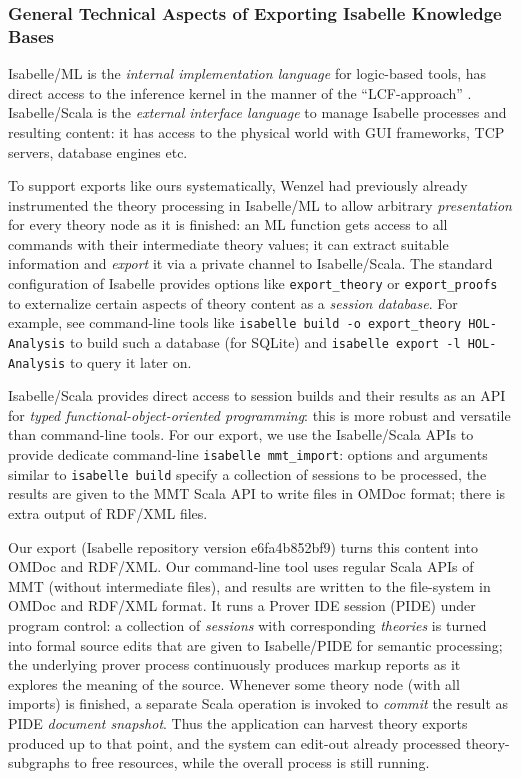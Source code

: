 \subsubsection{General Technical Aspects of Exporting Isabelle Knowledge Bases}

Isabelle/ML is the \emph{internal implementation language} for logic-based tools, has direct access to the inference kernel in the manner of the ``LCF-approach'' \cite{Gordon-Milner-Wadsworth:1979}.
Isabelle/Scala is the \emph{external interface language} to manage Isabelle processes and
resulting content: it has access to the physical world with GUI frameworks, TCP servers, database engines etc.

To support exports like ours systematically, Wenzel had previously already instrumented the theory processing in Isabelle/ML to allow arbitrary \emph{presentation} for every theory node as it is finished: an ML function gets access to all commands with their intermediate theory
values; it can extract suitable information and \emph{export} it via a private channel to Isabelle/Scala.
The standard configuration of Isabelle provides options like \verb,export_theory, or \verb,export_proofs, to externalize certain aspects of theory content as a \emph{session database}.
For example, see command-line tools like \verb,isabelle build -o export_theory HOL-Analysis, to build such a database (for SQLite) and \verb,isabelle export -l HOL-Analysis, to query it later on.

Isabelle/Scala provides direct access to session builds and their results as an API for \emph{typed functional-object-oriented programming}: this is more robust and versatile than command-line tools.
For our export, we use the Isabelle/Scala APIs to provide dedicate command-line \verb,isabelle mmt_import,: options and arguments similar to \verb,isabelle build, specify a collection of sessions to be processed, the results are given to the MMT Scala API to write files in OMDoc format; there is extra output of RDF/XML files.

Our export (Isabelle repository version e6fa4b852bf9) turns this content into OMDoc and RDF/XML.
Our command-line tool uses regular Scala APIs of MMT (without intermediate files), and results are written to the file-system in OMDoc and RDF/XML format.
It runs a Prover IDE session (PIDE) under program control: a collection of \emph{sessions} with corresponding \emph{theories} is turned into formal source edits that are given to Isabelle/PIDE for semantic processing; the underlying prover process continuously produces markup reports as it explores the meaning of the source.
Whenever some theory node (with all imports) is finished, a separate Scala operation is invoked to \emph{commit} the result as
PIDE \emph{document snapshot}.
Thus the application can harvest theory exports produced up to that point, and the system can edit-out already processed theory-subgraphs to free resources, while the overall process is still running.

